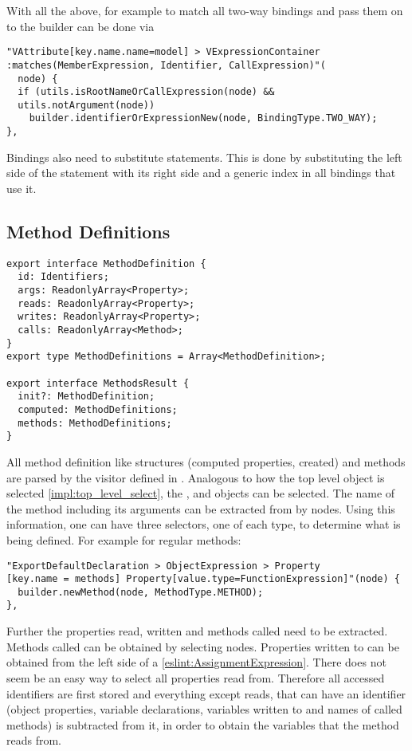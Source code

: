 With all the above, for example to match all two-way bindings and pass them on to the builder can be done via 
\begin{lstlisting}
"VAttribute[key.name.name=model] > VExpressionContainer
:matches(MemberExpression, Identifier, CallExpression)"(
  node) {
  if (utils.isRootNameOrCallExpression(node) && 
  utils.notArgument(node))
    builder.identifierOrExpressionNew(node, BindingType.TWO_WAY);
},
\end{lstlisting}


Bindings also need to substitute  statements. This is done by substituting the left side of the  statement with its right side and a generic index in all bindings that use it.

\subsection{Method Definitions}

\begin{lstlisting}
export interface MethodDefinition {
  id: Identifiers;
  args: ReadonlyArray<Property>;
  reads: ReadonlyArray<Property>;
  writes: ReadonlyArray<Property>;
  calls: ReadonlyArray<Method>;
}
export type MethodDefinitions = Array<MethodDefinition>;

export interface MethodsResult {
  init?: MethodDefinition;
  computed: MethodDefinitions;
  methods: MethodDefinitions;
}
\end{lstlisting}
All method definition like structures (computed properties, created) and methods are parsed by the visitor defined in .
Analogous to how the top level  object is selected \ref{impl:top_level_select}, the ,  and  objects can be selected. 
The name of the method including its arguments can be extracted from by  nodes. Using this information, one can have three selectors, one of each type, to determine what is being defined. For example for regular methods:
 
\begin{lstlisting}
"ExportDefaultDeclaration > ObjectExpression > Property
[key.name = methods] Property[value.type=FunctionExpression]"(node) {
  builder.newMethod(node, MethodType.METHOD);
},
\end{lstlisting}
Further the properties read, written and methods called need to be extracted. Methods called can be obtained by selecting  nodes. Properties written to can be obtained from the left side of a  \ref{eslint:AssignmentExpression}.
There does not seem be an easy way to select all properties read from. Therefore all accessed identifiers are first stored and everything except reads, that can have an identifier (object properties, variable declarations, variables written to and names of called methods) is subtracted from it, in order to obtain the variables that the method reads from.

